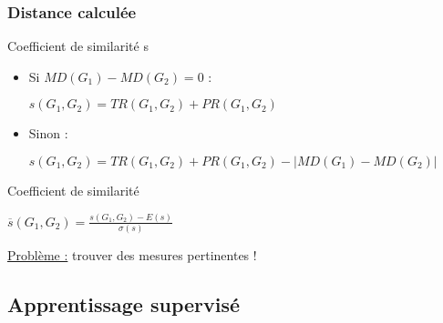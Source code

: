 \documentclass{beamer}
\begin{document}
\begin{frame}
\frametitle{Distance calculée}

\begin{block}{Coefficient de similarité s}
\begin{itemize}
\item Si $MD(G_{1}) - MD(G_{2}) = 0$ : 
\begin{center}
$ s(G_{1},G_{2}) = TR(G_{1},G_{2}) + PR(G_{1},G_{2})$
\end{center}
\item Sinon : 
\begin{center}
$ s(G_{1},G_{2}) = TR(G_{1},G_{2}) + PR(G_{1},G_{2}) - | MD(G_{1}) - MD(G_{2}) |$
\end{center}
\end{itemize}
\end{block}

\begin{block}{Coefficient de similarité }
\begin{center}
$\overline{s}(G_{1},G_{2}) = \frac{s(G_{1},G_{2}) - E(s)}{\sigma(s)}$
\end{center}
\end{block}



\uline{Problème :} trouver des mesures pertinentes !


\end{frame}

\subsection{Apprentissage supervisé}
\end{document}
